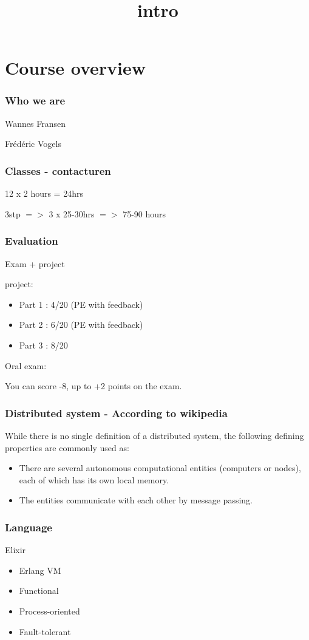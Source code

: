 \documentclass{../ucll-slides}
\title{intro}
\begin{document}
\maketitle

\section{Course overview}

\begin{frame}
    \frametitle{Who we are}
    Wannes Fransen

    Frédéric Vogels
\end{frame}

\begin{frame}
    \frametitle{Classes - contacturen}
    12 x 2 hours = 24hrs 

    3stp $=>$ 3 x 25-30hrs $=>$ 75-90 hours 
\end{frame}

\begin{frame}
    \frametitle{Evaluation}
    Exam + project

    project: 
    \begin{itemize}
        \item Part 1 : 4/20 (PE with feedback)
        \item Part 2 : 6/20 (PE with feedback)
        \item Part 3 : 8/20 
    \end{itemize}

    Oral exam:

    You can score -8, up to +2 points on the exam.
\end{frame}

\begin{frame}
    \frametitle{Distributed system - According to wikipedia}

    While there is no single definition of a distributed system, the following defining properties are commonly used as:
    \begin{itemize}
        \item There are several autonomous computational entities (computers or nodes), each of which has its own local memory.
        \item The entities communicate with each other by message passing.
    \end{itemize}
    
\end{frame}

\begin{frame}
    \frametitle{Language}
    Elixir 

    \begin{itemize}
        \item Erlang VM
        \item Functional
        \item Process-oriented
        \item Fault-tolerant
    \end{itemize}
\end{frame}
\end{document}
